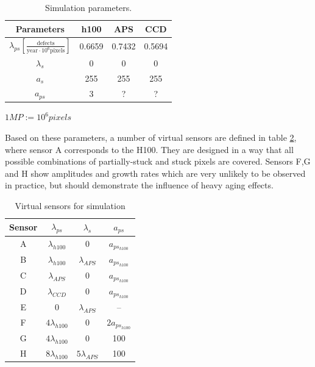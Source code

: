 \documentclass[10pt,twocolumn,letterpaper]{article}
\begin{document}
 \bgroup
\def\arraystretch{1.3}%
 \begin{table} [hbt]
  \begin{center}
    \begin{tabular}{|c | c c c|}
    \hline 
    \textbf{Parameters} & h100  & APS \cite{leung} & CCD \cite{leung} \\
    \hline 
    $\lambda_{ps} [\frac{\text{defects}}{\text{year} \cdot 10^6 \text{pixels}}]$  & 0.6659 &  0.7432 & 0.5694 \\
    $\lambda_s$ 	&  0  & 0 & 0 \\
    $a_s$		&  255  & 255 & 255 \\
    $a_{ps}$	&  3  & ? & ? \\
    \hline  
    \end{tabular}

    \vspace{1mm}
    \hfill \tiny { $1MP := 10^6 pixels$}
     \vspace{-2mm}
    
    \caption{Simulation parameters. }
    \label{table:parameters}
  \end{center}
\end{table}

\egroup

  Based on these parameters, a number of virtual sensors are defined in table \ref{table:tests}, where sensor A corresponds to the H100. They are designed in a way that all possible combinations of partially-stuck and stuck pixels are covered. Sensors F,G and H show amplitudes and growth rates which are very unlikely to be observed in practice, but should demonstrate the influence of heavy aging effects. 
 
 \begin{table}[hbt]  
  \begin{center}

  \begin{tabular}{c | c c c }
  Sensor & $\lambda_{ps}$ & $\lambda_{s}$ & $a_{ps}$  \\
  \hline
  A	&	$\lambda_{h100}$ & 0 & $a_{ps_{h100}}$ \\
  B & $\lambda_{h100}$ & $\lambda_{APS}$ & $a_{ps_{h100}}$ \\
  C & $\lambda_{APS}$ & 0 & $a_{ps_{h100}}$    \\
  D & $\lambda_{CCD}$ & 0 & $a_{ps_{h100}}$   \\
  E & 0 & $\lambda_{APS}$ & -- \\
  F & $ 4 \lambda_{h100}$ & 0 & $ 2 a_{ps_{h100}}$ \\
  G & $ 4 \lambda_{h100}$ & 0 & 100 \\
  H & $ 8 \lambda_{h100}$ &  $ 5 \lambda_{APS}$ & 100

  \end{tabular}
    
    \vspace{3mm}
    \caption{Virtual sensors for simulation}
    \label{table:tests}
  \end{center}
 \end{table}
  
\end{document}
